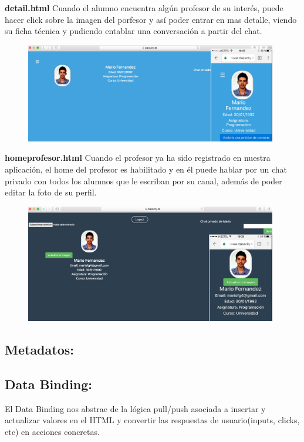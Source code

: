 \item \textbf{detail.html} Cuando el alumno encuentra algún profesor de su interés, puede hacer click sobre la imagen del porfesor y así poder entrar en mas detalle, viendo su ficha técnica y pudiendo entablar una conversación a partir del chat.
\begin{figure}[H]
    \centering
    \includegraphics[width=110mm]{memoria/LaTeX/img/templates/detailprof.png}
\end{figure}

\item \textbf{homeprofesor.html} Cuando el profesor ya ha sido registrado en nuestra aplicación, el home del profesor es habilitado y en él puede hablar por un chat privado con todos los alumnos que le escriban por su canal, además de poder editar la foto de su perfil. 
\begin{figure}[H]
    \centering
    \includegraphics[width=110mm]{memoria/LaTeX/img/templates/homeprof.png}
\end{figure}

\subsection{Metadatos: }
\subsection{Data Binding: } El Data Binding nos abstrae de la lógica pull/push asociada a insertar y actualizar valores en el HTML y convertir las respuestas de usuario(inputs, clicks, etc) en acciones concretas.

